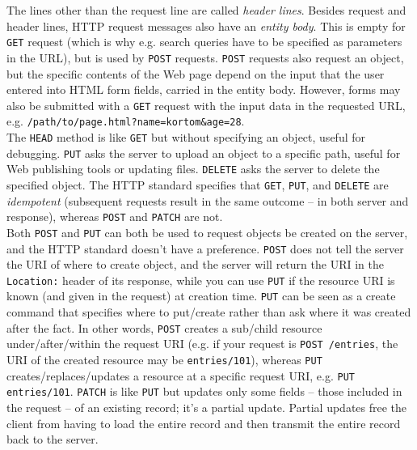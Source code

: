 \documentclass[table, xcdraw]{article}%
\begin{document}
The lines other than the request line are called \emph{header lines}. Besides request and header lines, HTTP request messages also have an \emph{entity body}. This is empty for \texttt{GET} request (which is why e.g. search queries have to be specified as parameters in the URL), but is used by \texttt{POST} requests. \texttt{POST} requests also request an object, but the specific contents of the Web page depend on the input that the user entered into HTML form fields, carried in the entity body. However, forms may also be submitted with a \texttt{GET} request with the input data in the requested URL, e.g. \texttt{/path/to/page.html?name=kortom&age=28}.\\
The \texttt{HEAD} method is like \texttt{GET} but without specifying an object, useful for debugging. \texttt{PUT} asks the server to upload an object to a specific path, useful for Web publishing tools or updating files. \texttt{DELETE} asks the server to delete the specified object. The HTTP standard specifies that \texttt{GET}, \texttt{PUT}, and \texttt{DELETE} are \emph{idempotent} (subsequent requests result in the same outcome -- in both server and response), whereas \texttt{POST} and \texttt{PATCH} are not.\\
Both \texttt{POST} and \texttt{PUT} can both be used to request objects be created on the server, and the HTTP standard doesn't have a preference. \texttt{POST} does not tell the server the URI of where to create object, and the server will return the URI in the \texttt{Location:} header of its response, while you can use \texttt{PUT} if the resource URI is known (and given in the request) at creation time. \texttt{PUT} can be seen as a create command that specifies where to put/create rather than ask where it was created after the fact. In other words, \texttt{POST} creates a sub/child resource under/after/within the request URI (e.g. if your request is \texttt{POST /entries}, the URI of the created resource may be \texttt{entries/101}), whereas \texttt{PUT} creates/replaces/updates a resource at a specific request URI, e.g. \texttt{PUT entries/101}. \texttt{PATCH} is like \texttt{PUT} but updates only some fields -- those included in the request -- of an existing record; it's a partial update. Partial updates free the client from having to load the entire record and then transmit the entire record back to the server.
\end{document}
